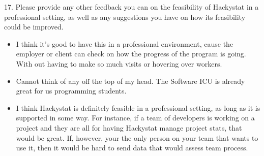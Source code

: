 17. Please provide any other feedback you can on the feasibility of Hackystat in a professional setting, as well as any suggestions you have on how its feasibility could be improved.
\begin{itemize}
\item I think it's good to have this in a professional environment, cause the employer or client  can check on how the progress of the program is going. With out having to make so much visits or hovering over workers.
\item Cannot think of any off the top of my head.  The Software ICU is already great for us programming students.  
\item I think Hackystat is definitely feasible in a professional setting, as long as it is supported in some way. For instance, if a team of developers is working on a project and they are all for having Hackystat manage project stats, that would be great. If, however, your the only person on your team that wants to use it, then it would be hard to send data that would assess team process.


\end{itemize}
